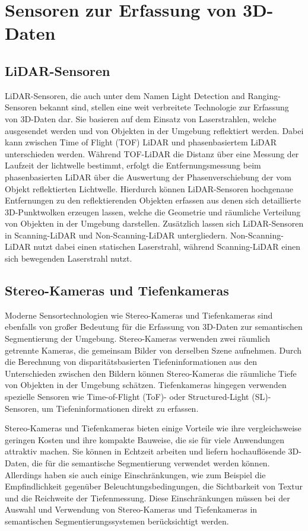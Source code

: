 \chapter{Sensoren zur Erfassung von 3D-Daten}

\section{LiDAR-Sensoren}
LiDAR-Sensoren, die auch unter dem Namen Light Detection and Ranging-Sensoren
bekannt sind, stellen eine weit verbreitete Technologie zur Erfassung von
3D-Daten dar. Sie basieren auf dem Einsatz von Laserstrahlen, welche
ausgesendet werden und von Objekten in der Umgebung reflektiert werden. Dabei
kann zwischen Time of Flight (TOF) LiDAR und phasenbasiertem LiDAR
unterschieden werden. Während TOF-LiDAR die Distanz über eine Messung der
Laufzeit der lichtwelle bestimmt, erfolgt die Entfernungsmessung beim
phasenbasierten LiDAR über die Auswertung der Phasenverschiebung der vom Objekt
reflektierten Lichtwelle. Hierdurch können LiDAR-Sensoren hochgenaue
Entfernungen zu den reflektierenden Objekten erfassen aus denen sich
detaillierte 3D-Punktwolken erzeugen lassen, welche die Geometrie und räumliche
Verteilung von Objekten in der Umgebung darstellen. Zusätzlich lassen sich
LiDAR-Sensoren in Scanning-LiDAR und Non-Scanning-LiDAR untergliedern.
Non-Scanning-LiDAR nutzt dabei einen statischen Laserstrahl, während
Scanning-LiDAR einen sich bewegenden Laserstrahl nutzt. \cite{8529992}

\section{Stereo-Kameras und Tiefenkameras}
Moderne Sensortechnologien wie Stereo-Kameras und Tiefenkameras sind ebenfalls
von großer Bedeutung für die Erfassung von 3D-Daten zur semantischen
Segmentierung der Umgebung. Stereo-Kameras verwenden zwei räumlich getrennte
Kameras, die gemeinsam Bilder von derselben Szene aufnehmen. Durch die
Berechnung von disparitätsbasierten Tiefeninformationen aus den Unterschieden
zwischen den Bildern können Stereo-Kameras die räumliche Tiefe von Objekten in
der Umgebung schätzen. Tiefenkameras hingegen verwenden spezielle Sensoren wie
Time-of-Flight (ToF)- oder Structured-Light (SL)-Sensoren, um
Tiefeninformationen direkt zu erfassen.

Stereo-Kameras und Tiefenkameras bieten einige Vorteile wie ihre
vergleichsweise geringen Kosten und ihre kompakte Bauweise, die sie für viele
Anwendungen attraktiv machen. Sie können in Echtzeit arbeiten und liefern
hochauflösende 3D-Daten, die für die semantische Segmentierung verwendet werden
können. Allerdings haben sie auch einige Einschränkungen, wie zum Beispiel die
Empfindlichkeit gegenüber Beleuchtungsbedingungen, die Sichtbarkeit von Textur
und die Reichweite der Tiefenmessung. Diese Einschränkungen müssen bei der
Auswahl und Verwendung von Stereo-Kameras und Tiefenkameras in semantischen
Segmentierungssystemen berücksichtigt werden.


